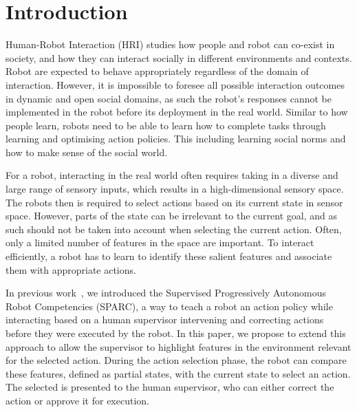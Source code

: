 \documentclass[letterpaper]{article} %
\begin{document}
\section{Introduction}

Human-Robot Interaction (HRI) studies how people and robot can co-exist in society, and how they can interact socially in different environments and
contexts. Robot are expected to behave appropriately regardless of the domain
of interaction. However, it is impossible to foresee all possible interaction outcomes in dynamic and open social domains, as such the robot's responses cannot be implemented in the robot before its deployment in the real world. Similar to
how people learn, robots need to be able to learn how to complete tasks through learning and optimising action policies. This including learning social norms and how to make sense of the social world.

For a robot, interacting in the real world often requires taking in a diverse and large range of sensory inputs, which results in a high-dimensional sensory space. The robots then is required to select actions based on its current state in sensor space. However,
 parts of the state can be irrelevant to the current goal, and
 as such should not be taken into account when selecting the current action. Often, only a limited number of
 features in the space are important. To interact efficiently, a robot has to
 learn to identify these salient features and associate them with appropriate actions.


In previous work~\cite{senft2015sparc,senft2017supervised}, we introduced the
Supervised Progressively Autonomous Robot Competencies (SPARC), a way to
teach a robot an action policy while interacting based on a human supervisor
intervening and correcting actions before they were executed by the robot. In this paper, we propose
to extend this approach to allow the supervisor to highlight features in the
environment relevant for the selected action. During the action selection
phase, the robot can compare these features, defined as partial states, with the
current state to select an action. The selected is presented to the human supervisor, who can either correct the action or approve it for execution.
\end{document}
